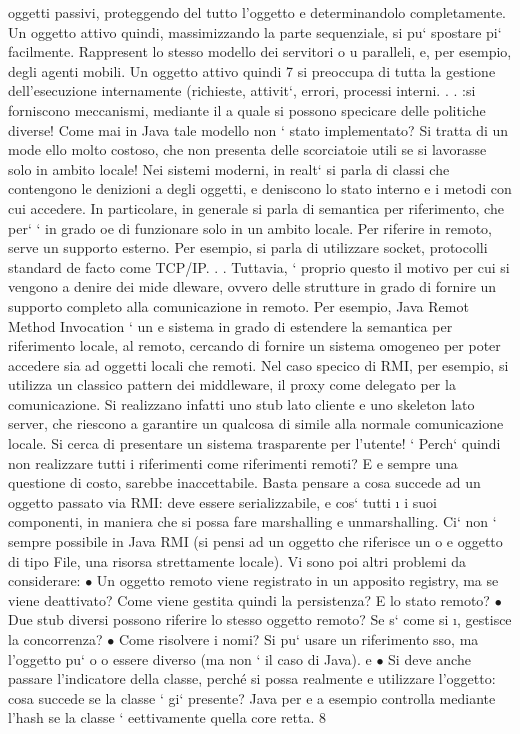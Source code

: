 \documentclass[a4paper,12pt]{article}
\begin{document}
oggetti passivi, proteggendo del tutto l'oggetto e determinandolo completamente. Un oggetto attivo quindi, massimizzando
la parte sequenziale,
si pu` spostare pi` facilmente. Rappresent lo stesso modello dei servitori
o
u
paralleli, e, per esempio, degli agenti mobili. Un oggetto attivo quindi
7
\newpage
si preoccupa di tutta la gestione dell'esecuzione internamente (richieste,
attivit`, errori, processi interni. . . :si forniscono meccanismi, mediante il
a
quale si possono specicare delle politiche diverse!
Come mai in Java tale modello non ` stato implementato? Si tratta di un mode
ello molto costoso, che non presenta delle scorciatoie utili se si lavorasse solo in
ambito locale!
Nei sistemi moderni, in realt` si parla di classi che contengono le denizioni
a
degli oggetti, e deniscono lo stato interno e i metodi con cui accedere. In particolare, in generale si parla di
semantica per riferimento, che per` ` in grado
oe
di funzionare solo in un ambito locale. Per riferire in remoto, serve un supporto
esterno. Per esempio, si parla di utilizzare socket, protocolli standard de facto
come TCP/IP. . .
Tuttavia, ` proprio questo il motivo per cui si vengono a denire dei mide
dleware, ovvero delle strutture in grado di fornire un supporto completo alla
comunicazione in remoto. Per esempio, Java Remot Method Invocation ` un
e
sistema in grado di estendere la semantica per riferimento locale, al remoto,
cercando di fornire un sistema omogeneo per poter accedere sia ad oggetti locali
che remoti. Nel caso specico di RMI, per esempio, si utilizza un classico pattern dei middleware, il proxy come delegato
per la comunicazione. Si realizzano
infatti uno stub lato cliente e uno skeleton lato server, che riescono a garantire
un qualcosa di simile alla normale comunicazione locale. Si cerca di presentare
un sistema trasparente per l'utente!
`
Perch` quindi non realizzare tutti i riferimenti come riferimenti remoti? E
e
sempre una questione di costo, sarebbe inaccettabile. Basta pensare a cosa
succede ad un oggetto passato via RMI: deve essere serializzabile, e cos` tutti
\i{}
i suoi componenti, in maniera che si possa fare marshalling e unmarshalling.
Ci` non ` sempre possibile in Java RMI (si pensi ad un oggetto che riferisce un
o
e
oggetto di tipo File, una risorsa strettamente locale). Vi sono poi altri problemi
da considerare:
$\bullet$ Un oggetto remoto viene registrato in un apposito registry, ma se viene
deattivato? Come viene gestita quindi la persistenza? E lo stato remoto?
$\bullet$ Due stub diversi possono riferire lo stesso oggetto remoto? Se s` come si
\i{},
gestisce la concorrenza?
$\bullet$ Come risolvere i nomi? Si pu` usare un riferimento sso, ma l'oggetto pu`
o
o
essere diverso (ma non ` il caso di Java).
e
$\bullet$ Si deve anche passare l'indicatore della classe, perché si possa realmente
e
utilizzare l'oggetto: cosa succede se la classe ` gi` presente? Java per
e a
esempio controlla mediante l'hash se la classe ` eettivamente quella core
retta.
8
\end{document}
